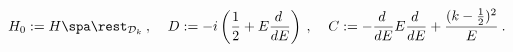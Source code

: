 \begin{equation}
H_0 := H\spa\rest_{{\cal D}_k}\:,\:\:\:\:\:
D := -i\left(\frac{1}{2} + E\frac{d \:}{d E}\right)\:, \:\:\:\:\:
C := -\frac{d \:}{d E} E\frac{d \:}{d E} +
\frac{(k-\frac{1}{2})^2}{E}\:.\label{ge3}  
\end{equation} 
